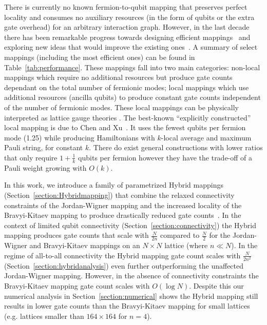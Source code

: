 There is currently no known fermion-to-qubit mapping that preserves perfect locality and consumes no auxiliary resources (in the form of qubits or the extra gate overhead) for an arbitrary interaction graph. However, in the last decade there has been remarkable progress towards designing efficient mappings~\cite{Verstraete_2005, 
setia2019superfast,havlivcek2017operator,bravyi2002fermionic,seeley2012bravyi, derby2021compact,chen2022equivalence, steudtner2019quantum} and exploring new ideas that would improve the existing ones~\cite{chiew2021optimal}. A summary of select mappings (including the most efficient ones) can be found in Table~\ref{tab:performance}. These mappings fall into two main categories: non-local mappings which require no additional resources but produce gate counts dependant on the total number of fermionic modes; local mappings which use additional resources (ancilla qubits) to produce constant gate counts independent of the number of fermionic modes. These local mappings can be physically interpreted as lattice gauge theories \cite{Chen_2018}. The best-known “explicitly constructed” local mapping is due to Chen and Xu~\cite{chen2022equivalence}. It uses the fewest qubits per fermion mode (1.25) while producing Hamiltonians with $k$-local average and maximum Pauli string, for constant $k$. There do exist general constructions with lower ratios that only require $1+ \frac{1}{k}$ qubits per fermion however they have the trade-off of a Pauli weight growing with $O(k)$. 

In this work, we introduce a family of parametrized Hybrid mappings (Section~\ref{section:Hybridmapping}) that combine the relaxed connectivity constraints of the Jordan-Wigner mapping and the increased locality of the Bravyi-Kitaev mapping to produce drastically reduced gate counts~\cite{tranter2018comparison}. In the context of limited qubit connectivity (Section~\ref{section:connectivity}) the Hybrid mapping produces gate counts that scale with $\frac{N}{2n}$ compared to $\frac{N}{2}$ for the Jordan-Wigner and Bravyi-Kitaev mappings on an $N\times N$ lattice (where $n \ll N$). In the regime of all-to-all connectivity the Hybrid mapping gate count scales with $\frac{N}{2n^2}$ (Section~\ref{section:hybridanalysis}) even further outperforming the unaffected Jordan-Wigner mapping. However, in the absence of connectivity constraints the Bravyi-Kitaev mapping gate count scales with $O(\log N)$. Despite this our numerical analysis in Section~\ref{section:numerical} shows the Hybrid mapping still results in lower gate counts than the Bravyi-Kitaev mapping for small lattices (e.g. lattices smaller than $164 \times 164$ for $n=4$).

